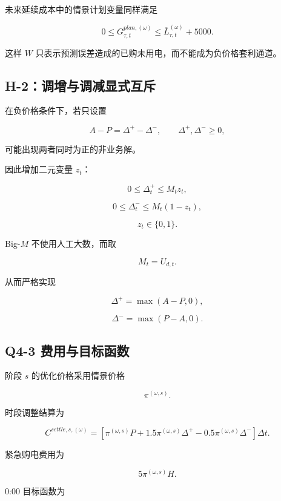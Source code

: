 未来延续成本中的情景计划变量同样满足

\begin{equation}
0\le
G_{\tau,t}^{plan,(\omega)}
\le
\overline L_{\tau,t}^{(\omega)}
+
5000.
\end{equation}

这样 \(W\) 只表示预测误差造成的已购未用电，而不能成为负价格套利通道。

\subsection{H-2：调增与调减显式互斥}

在负价格条件下，若只设置

\[
A-P=\Delta^+-\Delta^-,
\qquad
\Delta^+,\Delta^-\ge0,
\]

可能出现两者同时为正的非业务解。

因此增加二元变量 \(z_t\)：

\[
0\le\Delta_t^+\le M_tz_t,
\]

\[
0\le\Delta_t^-\le M_t(1-z_t),
\]

\begin{equation}
z_t\in\{0,1\}.
\end{equation}

Big-\(M\) 不使用人工大数，而取

\begin{equation}
M_t=U_{d,t}.
\end{equation}

从而严格实现

\[
\Delta^+
=
\max(A-P,0),
\]

\[
\Delta^-
=
\max(P-A,0).
\]

\subsection{Q4-3 费用与目标函数}

阶段 \(s\) 的优化价格采用情景价格

\[
\pi^{(\omega,s)}.
\]

时段调整结算为

\begin{equation}
C^{settle,s,(\omega)}
=
\left[
\pi^{(\omega,s)}P
+
1.5\pi^{(\omega,s)}\Delta^+
-
0.5\pi^{(\omega,s)}\Delta^-
\right]\Delta t.
\end{equation}

紧急购电费用为

\[
5\pi^{(\omega,s)}H.
\]

0:00 目标函数为

